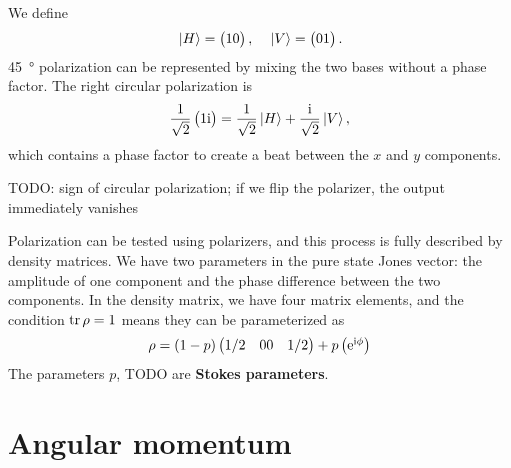 \documentclass[hyperref, a4paper]{article}
\newcommand*{\ii}{\mathrm{i}}
\newcommand*{\ee}{\mathrm{e}}
\newcommand*{\concept}[1]{{\textbf{#1}}}
\def\\{}%
\begin{document}
We define 
\begin{equation}
    \ket*{H} = \pmqty{1 \\ 0}, \quad 
    \ket*{V} = \pmqty{0 \\ 1}.
\end{equation}
\SI{45}{\degree} polarization can be represented by 
mixing the two bases without a phase factor.
The right circular polarization is 
\begin{equation}
    \frac{1}{\sqrt{2}} \pmqty{1 \\ \ii} = 
    \frac{1}{\sqrt{2}} \ket*{H} 
    + \frac{\ii}{\sqrt{2}} \ket*{V} ,
\end{equation}
which contains a phase factor to create a beat 
between the $x$ and $y$ components. 

TODO: sign of circular polarization; if we flip the polarizer,
the output immediately vanishes

Polarization can be tested using polarizers, 
and this process is fully described by density matrices. 
We have two parameters in the pure state Jones vector:
the amplitude of one component 
and the phase difference between the two components.
In the density matrix, 
we have four matrix elements, 
and the condition $\tr \rho = 1$ means they can be parameterized as 
\begin{equation}
    \rho = (1 - p) \pmqty{
        1/2 & 0 \\ 0 & 1/2
    } + p \pmqty{
        \ee^{\ii \phi}
    }
\end{equation}
The parameters $p$, TODO are \concept{Stokes parameters}.

\section{Angular momentum}
\end{document}
